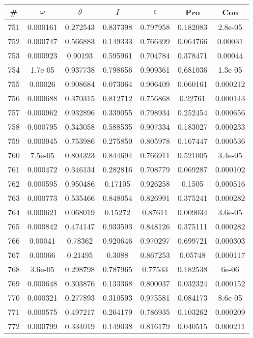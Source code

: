 \newpage
\begin{table}
\begin{tabular}{c|c|c|c|c|c|c}
\# & $\omega$ & $\theta$ & $I$ & $\epsilon$ & Pro & Con\\
\hline
751 & 0.000161 & 0.272543 & 0.837398 & 0.797958 & 0.182083 & 2.8e-05\\
752 & 0.000747 & 0.566883 & 0.149333 & 0.766399 & 0.064766 & 0.00031\\
753 & 0.000923 & 0.90193 & 0.595961 & 0.704784 & 0.378471 & 0.00044\\
754 & 1.7e-05 & 0.937738 & 0.798656 & 0.909361 & 0.681036 & 1.3e-05\\
755 & 0.00026 & 0.908684 & 0.073064 & 0.906409 & 0.060161 & 0.000212\\
756 & 0.000688 & 0.370315 & 0.812712 & 0.756868 & 0.22761 & 0.000143\\
757 & 0.000962 & 0.932896 & 0.339055 & 0.798934 & 0.252454 & 0.000656\\
758 & 0.000795 & 0.343058 & 0.588535 & 0.907334 & 0.183027 & 0.000233\\
759 & 0.000945 & 0.753986 & 0.275859 & 0.805978 & 0.167447 & 0.000536\\
760 & 7.5e-05 & 0.804323 & 0.844694 & 0.766911 & 0.521005 & 3.4e-05\\
761 & 0.000472 & 0.346134 & 0.282816 & 0.708779 & 0.069287 & 0.000102\\
762 & 0.000595 & 0.950486 & 0.17105 & 0.926258 & 0.1505 & 0.000516\\
763 & 0.000773 & 0.535466 & 0.848054 & 0.826991 & 0.375241 & 0.000282\\
764 & 0.000621 & 0.068019 & 0.15272 & 0.87611 & 0.009034 & 3.6e-05\\
765 & 0.000842 & 0.474147 & 0.933593 & 0.848126 & 0.375111 & 0.000282\\
766 & 0.00041 & 0.78362 & 0.920646 & 0.970297 & 0.699721 & 0.000303\\
767 & 0.00066 & 0.21495 & 0.3088 & 0.867253 & 0.05748 & 0.000117\\
768 & 3.6e-05 & 0.298798 & 0.787965 & 0.77533 & 0.182538 & 6e-06\\
769 & 0.000648 & 0.303876 & 0.133368 & 0.800037 & 0.032324 & 0.000152\\
770 & 0.000321 & 0.277893 & 0.310593 & 0.975581 & 0.084173 & 8.6e-05\\
771 & 0.000575 & 0.497217 & 0.264179 & 0.786935 & 0.103262 & 0.000209\\
772 & 0.000799 & 0.334019 & 0.149038 & 0.816179 & 0.040515 & 0.000211\\

\end{tabular}
\end{table}
